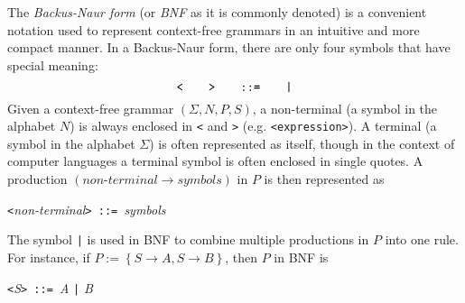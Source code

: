 \documentclass[12pt]{article}
\begin{document}

The \emph{Backus-Naur form} (or \emph{BNF} as it is commonly denoted) is a convenient notation used to represent context-free grammars in an intuitive and more compact manner.  In a Backus-Naur form, there are only four symbols that have special meaning: 
$$\verb.<.\qquad \verb.>.\qquad \verb.::=.\qquad \verb.|.$$ 
Given a context-free grammar $(\Sigma,N,P,S)$, a non-terminal (a symbol in the alphabet $N$) is always enclosed in \verb.<. and \verb.>. (e.g. \verb.<expression>.).
A terminal (a symbol in the alphabet $\Sigma$) is often represented as itself, though in the context of computer languages a terminal symbol is often enclosed in single quotes. A production $(\textit{non-terminal}\to \textit{symbols})$ in $P$ is then represented as

\begin{center}
\verb.<.\textit{non-terminal}\verb.> ::= .\textit{symbols}
\end{center}

The symbol \verb.|. is used in BNF to combine multiple productions in $P$ into
one rule. For instance, if $P := \left\{S\to A, S\to B\right\}$, then $P$ in
BNF is

\begin{center}
\verb.<.\textit{S}\verb.> ::= .\textit{A} \verb.|. \textit{B}
\end{center}
\end{document}
